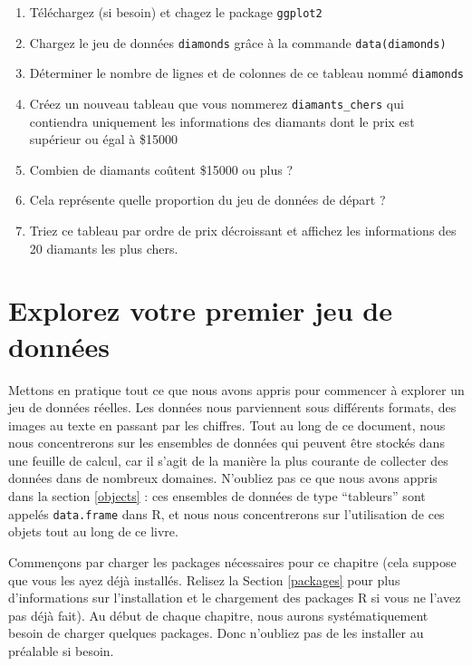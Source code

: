 \documentclass[a4paperpaper,]{article}
\providecommand{\tightlist}{%
  \setlength{\itemsep}{0pt}\setlength{\parskip}{0pt}}
\theoremstyle{definition}
\theoremstyle{definition}
\theoremstyle{definition}
\theoremstyle{remark}
\begin{document}
\begin{enumerate}
\def\labelenumi{\arabic{enumi}.}
\tightlist
\item
  Téléchargez (si besoin) et chagez le package \texttt{ggplot2}
\item
  Chargez le jeu de données \texttt{diamonds} grâce à la commande
  \texttt{data(diamonds)}
\item
  Déterminer le nombre de lignes et de colonnes de ce tableau nommé
  \texttt{diamonds}
\item
  Créez un nouveau tableau que vous nommerez \texttt{diamants\_chers}
  qui contiendra uniquement les informations des diamants dont le prix
  est supérieur ou égal à \$15000
\item
  Combien de diamants coûtent \$15000 ou plus ?
\item
  Cela représente quelle proportion du jeu de données de départ ?
\item
  Triez ce tableau par ordre de prix décroissant et affichez les
  informations des 20 diamants les plus chers.
\end{enumerate}

\hypertarget{dataset}{%
\section{Explorez votre premier jeu de données}\label{dataset}}

Mettons en pratique tout ce que nous avons appris pour commencer à
explorer un jeu de données réelles. Les données nous parviennent sous
différents formats, des images au texte en passant par les chiffres.
Tout au long de ce document, nous nous concentrerons sur les ensembles
de données qui peuvent être stockés dans une feuille de calcul, car il
s'agit de la manière la plus courante de collecter des données dans de
nombreux domaines. N'oubliez pas ce que nous avons appris dans la
section \ref{objects} : ces ensembles de données de type ``tableurs''
sont appelés \texttt{data.frame} dans R, et nous nous concentrerons sur
l'utilisation de ces objets tout au long de ce livre.

Commençons par charger les packages nécessaires pour ce chapitre (cela
suppose que vous les ayez déjà installés. Relisez la Section
\ref{packages} pour plus d'informations sur l'installation et le
chargement des packages R si vous ne l'avez pas déjà fait). Au début de
chaque chapitre, nous aurons systématiquement besoin de charger quelques
packages. Donc n'oubliez pas de les installer au préalable si besoin.
\end{document}
